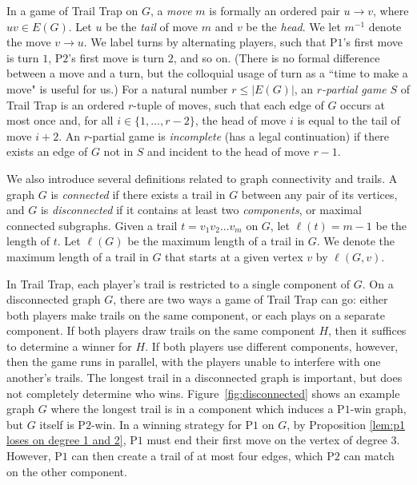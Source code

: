\documentclass{article}
\theoremstyle{plain}
\theoremstyle{definition}
\newcommand{\MaxTrail}{\ell}
\def\pone{{\rm{P}\ensuremath{1}}}
\def\ptwo{{\rm{P}\ensuremath{2}}}
\def\poneposs{{\rm{P}\ensuremath{1}'s}}
\def\ptwoposs{{\rm{P}\ensuremath{2}'s}}
\begin{document}
In a game of {\sc Trail Trap} on $G$, a \emph{move} $m$ is formally an ordered pair $u \rightarrow v$, where $uv\in E(G)$. Let $u$ be the \emph{tail} of move $m$ and $v$ be the \emph{head}. We let $m^{-1}$ denote the move $v \rightarrow u$. 
We label turns by alternating players, such that \poneposs{} first move is turn $1$, \ptwoposs{} first move is turn $2$, and so on. (There is no formal difference between a move and a turn, but the colloquial usage of turn as a ``time to make a move" is useful for us.) For a natural number $r\leq |E(G)|$, an {\em $r$-partial game} $S$ of {\sc Trail Trap} is an ordered $r$-tuple of moves, such that each edge of $G$ occurs at most once and, for all $i \in \{1, \ldots, r-2\}$, the head of move $i$ is equal to the tail of move $i + 2$. An $r$-partial game is \emph{incomplete} (has a legal continuation) if there exists an edge of $G$ not in $S$ and incident to the head of move $r-1$. 

We also introduce several definitions related to graph connectivity and trails. A graph $G$ is \emph{connected} if there exists a trail in $G$ between any pair of its vertices, and $G$ is \emph{disconnected} if it contains at least two \emph{components}, or maximal connected subgraphs. Given a trail $t = v_1 v_2 \ldots v_{m}$ on $G$, let $\MaxTrail(t) = m-1$ be the length of $t$. Let $\MaxTrail(G)$ be the maximum length of a trail in $G$. We denote the maximum length of a trail in $G$ that starts at a given vertex $v$ by $\MaxTrail(G,v)$.

In {\sc Trail Trap}, each player's trail is restricted to a single component of $G$. On a disconnected graph $G$, there are two ways a game of {\sc Trail Trap} can go: either both players make trails on the same component, or each plays on a separate component. If both players draw trails on the same component $H$, then it suffices to determine a winner for $H$. If both players use different components, however, then the game runs in parallel, with the players unable to interfere with one another's trails. The longest trail in a disconnected graph is important, but does not completely determine who wins. Figure~\ref{fig:disconnected} shows an example graph $G$ where the longest trail is in a component which induces a \pone{}-win graph, but $G$ itself is \ptwo{}-win. In a winning strategy for \pone{} on $G$, by Proposition \ref{lem:p1 loses on degree 1 and 2}, \pone{} must end their first move on the vertex of degree $3$. However, \pone{} can then create a trail of at most four edges, which \ptwo{} can match on the other component. 
\end{document}

